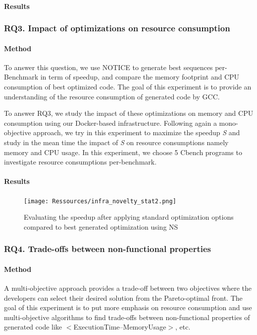 \paragraph{Results}
\subsubsection{RQ3. Impact of optimizations on resource consumption}
\paragraph{Method}
To answer this question, we use NOTICE to generate best sequences per-Benchmark in term of speedup, and compare the memory footprint and CPU consumption of best optimized code. The goal of this experiment is to provide an understanding of the resource consumption of generated code by GCC. 




To answer RQ3, we study the impact of these optimizations on memory and CPU consumption using our Docker-based infrastructure. Following again a mono-objective approach, we try in this experiment to maximize the speedup \textit{S} and study in the mean time the impact of \textit{S} on resource consumptions namely memory and CPU usage. In this experiment, we choose 5 Cbench programs to investigate resource consumptions per-benchmark.
\paragraph{Results}
\begin{figure}[h]
	\centering
	\texttt{[image: Ressources/infra\_novelty\_stat2.png]}
	\caption{Evaluating the speedup after applying standard optimization options compared to best generated optimization using NS}
\end{figure}
\subsubsection{RQ4. Trade-offs between non-functional properties}
\paragraph{Method}
A multi-objective approach provides a trade-off between two objectives where the developers can select their desired solution from the Pareto-optimal front. The goal of this experiment is to put more emphasis on resource consumption and use multi-objective algorithms to find trade-offs between non-functional properties of generated code like $<$ExecutionTime--MemoryUsage$>$, etc.



